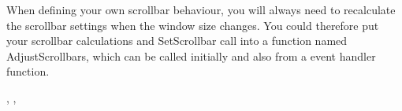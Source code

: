 When defining your own scrollbar behaviour, you will always need to recalculate
the scrollbar settings when the window size changes. You could therefore put your
scrollbar calculations and SetScrollbar
call into a function named AdjustScrollbars, which can be called initially and also
from a  event handler function.


,\rtfsp
{}, 

\begin{comment}
\membersection{wxScrollBar::SetViewLength}\label{wxscrollbarsetviewlength}

\func{void}{SetViewLength}{\param{int}{ viewLength}}

Sets the view length for the scrollbar.

\wxheading{Parameters}

\docparam{viewLength}{View length.}

\wxheading{See also}

\helpref{wxScrollBar::GetViewLength}{wxscrollbargetviewlength}
\end{comment}


